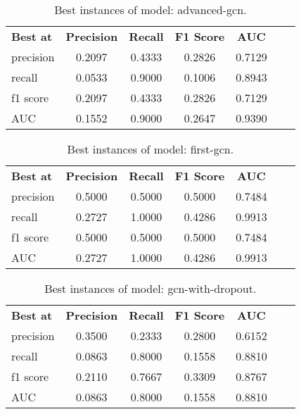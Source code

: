     \begin{table}[ht]
        \centering
        \caption{Best instances of model: advanced-gcn.}
        \begin{tabular}{lcccccc}
          \textbf{Best at}  & \textbf{Precision} & \textbf{Recall} & \textbf{F1 Score} & \textbf{AUC} \\
            precision & 0.2097 & 0.4333 & 0.2826 & 0.7129 \\
            recall & 0.0533 & 0.9000 & 0.1006 & 0.8943 \\
            f1 score & 0.2097 & 0.4333 & 0.2826 & 0.7129 \\
            AUC & 0.1552 & 0.9000 & 0.2647 & 0.9390 \\
        \end{tabular}
    \end{table}


    \begin{table}[ht]
        \centering
        \caption{Best instances of model: first-gcn.}
        \begin{tabular}{lcccccc}
          \textbf{Best at}  & \textbf{Precision} & \textbf{Recall} & \textbf{F1 Score} & \textbf{AUC} \\
            precision & 0.5000 & 0.5000 & 0.5000 & 0.7484 \\
            recall & 0.2727 & 1.0000 & 0.4286 & 0.9913 \\
            f1 score & 0.5000 & 0.5000 & 0.5000 & 0.7484 \\
            AUC & 0.2727 & 1.0000 & 0.4286 & 0.9913 \\
        \end{tabular}
    \end{table}


    \begin{table}[ht]
        \centering
        \caption{Best instances of model: gcn-with-dropout.}
        \begin{tabular}{lcccccc}
          \textbf{Best at}  & \textbf{Precision} & \textbf{Recall} & \textbf{F1 Score} & \textbf{AUC} \\
            precision & 0.3500 & 0.2333 & 0.2800 & 0.6152 \\
            recall & 0.0863 & 0.8000 & 0.1558 & 0.8810 \\
            f1 score & 0.2110 & 0.7667 & 0.3309 & 0.8767 \\
            AUC & 0.0863 & 0.8000 & 0.1558 & 0.8810 \\
        \end{tabular}
    \end{table}



